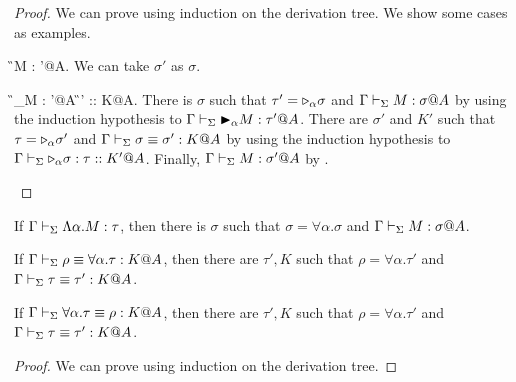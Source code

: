 \begin{proof}
    We can prove using induction on the derivation tree.
    We show some cases as examples.

    \begin{rneqncase}{\TTB{}}{\G \V M : \sigma'@A\alpha.}
        We can take $\sigma'$ as $\sigma$.
    \end{rneqncase}
    \begin{rneqncase}{\TConv{}}{
            \G \V \TB_\alpha M : \tau'@A  \G\V\tau' \E \tau :: K@A.
            }
            There is $\sigma$ such that $\tau' = {\mathop{\triangleright}}_\alpha \sigma$ and $\G \V M : \sigma@A$
            by using the induction hypothesis to \( \Gamma \vdash_\Sigma {\mathop{\blacktriangleright}}_\alpha M : \tau' @A\).
            There are $\sigma'$ and $K'$ such that $\tau = {\mathop{\triangleright}}_\alpha \sigma'$ and $\Gamma \vdash_\Sigma \sigma \equiv \sigma' : K @ A$
            by using the induction hypothesis to \( \Gamma \vdash_\Sigma {\mathop{\triangleright}}_\alpha \sigma : \tau :: K' @A\).
            Finally, $\Gamma \vdash_\Sigma M : \sigma' @ A $ by \TConv.
    \end{rneqncase}

\end{proof}

\begin{lemma}
    \begin{item}
    \item If $\Gamma \vdash_\Sigma \Lambda\alpha.M : \tau$, then
        there is $\sigma$ such that $\sigma = \forall\alpha.\sigma$ and $\G \V M : \sigma@A$.%
    \item If $\Gamma \vdash_\Sigma \rho \equiv \forall\alpha.\tau : K @A$, then there are $\tau', K$ such that
        $\rho = \forall\alpha.\tau'$ and $\Gamma \vdash_\Sigma \tau \equiv \tau' : K @A$.
    \item If $\Gamma \vdash_\Sigma \forall\alpha.\tau \equiv \rho : K @A$, then there are $\tau', K$ such that
        $\rho = \forall\alpha.\tau'$ and $\Gamma \vdash_\Sigma \tau \equiv \tau' : K @A$.
    \end{item}
\end{lemma}

\begin{proof}
    We can prove using induction on the derivation tree.


\end{proof}

